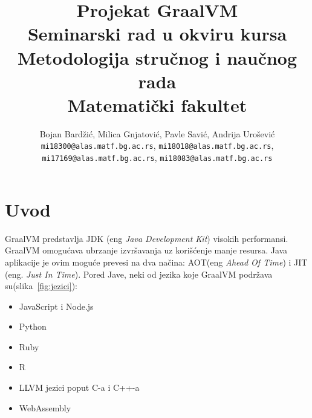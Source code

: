 \documentclass[a4paper]{article}
\begin{document}
\title{Projekat GraalVM\\ \small{Seminarski rad u okviru kursa\\Metodologija stručnog i naučnog rada\\ Matematički fakultet}}

\author{Bojan Bardžić, Milica Gnjatović, Pavle Savić, Andrija Urošević\\ 
	\texttt{mi18300@alas.matf.bg.ac.rs}, 
	\texttt{mi18018@alas.matf.bg.ac.rs}, \\ 
	\texttt{mi17169@alas.matf.bg.ac.rs}, 
	\texttt{mi18083@alas.matf.bg.ac.rs}}


\maketitle


\tableofcontents

\newpage

\section{Uvod}
\label{sec:uvod}
GraalVM predstavlja JDK (eng \emph{Java Development Kit}) visokih performansi\cite{graalvm}. GraalVM omogućava ubrzanje izvršavanja uz korišćenje manje resursa. Java aplikacije je ovim moguće prevesi na dva načina: AOT(eng \emph{Ahead Of Time}) i JIT (eng. \emph{Just In Time}). Pored Jave, neki od jezika koje GraalVM podržava su(slika~\ref{fig:jezici}): 
\begin{itemize}
	\item JavaScript i Node.js
	\item Python
	\item Ruby
	\item R
	\item LLVM jezici poput C-a i C++-a
	\item WebAssembly\\
\end{itemize}
\end{document}

